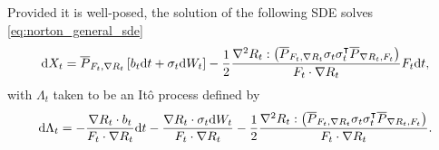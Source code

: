 \begin{prop}\label{prop:norton_sde}
   Provided it is well-posed, the solution of the following SDE solves \eqref{eq:norton_general_sde}
    \begin{equation}
        \label{eq:norton_general_sde_solved}
        \mathrm{d} X_t = \overline{P}_{F_t,\nabla R_t}\left[b_t\mathrm{d} t + \sigma_t\mathrm{d} W_t\right] - \frac{1}{2}\frac{\nabla^2 R_t : \left(\overline{P}_{F_t,\nabla R_t}\sigma_t \sigma_t^\intercal\overline{P}_{\nabla R_t,F_t}\right)}{F_t\cdot \nabla R_t}F_t\mathrm{d} t,
    \end{equation}
    with $\Lambda_t$ taken to be an Itô process defined by
    \begin{equation}
        \label{eq:norton_sde_multiplier_solved}
        \mathrm{d} \Lambda_t = -\frac{\nabla R_t \cdot b_t}{F_t\cdot \nabla R_t}\mathrm{d} t-\frac{\nabla R_t\cdot \sigma_t\mathrm{d} W_t}{F_t\cdot \nabla R_t}-\frac12\frac{\nabla^2 R_t : \left(\overline{P}_{F_t,\nabla R_t}\sigma_t\sigma_t^\intercal\overline{P}_{\nabla R_t,F_t}\right)}{F_t\cdot \nabla R_t}.
    \end{equation}
\end{prop}
